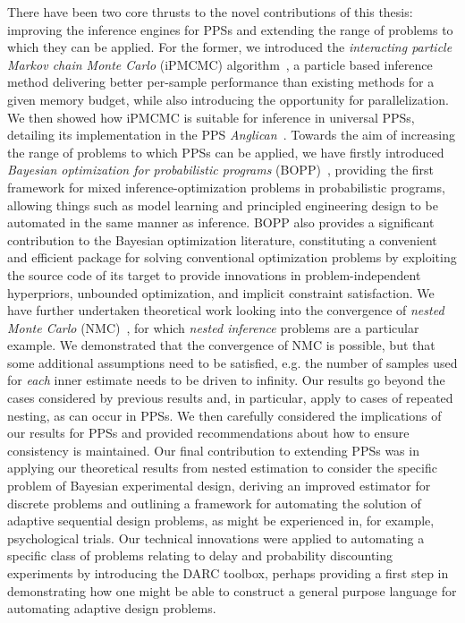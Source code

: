 There have been two core thrusts to the novel contributions of this thesis: improving the inference engines
for PPSs and extending the range of problems to which they can be applied.  For
the former, we introduced the \emph{interacting particle Markov chain Monte Carlo} (iPMCMC)
algorithm~\citep{rainforth2016interacting}, a particle based inference method delivering
better per-sample performance than existing methods for a given memory budget, while also introducing the opportunity for
parallelization.  We then showed how iPMCMC is suitable for inference in universal PPSs, detailing its implementation
in the PPS \emph{Anglican}~\citep{tolpin2016design}.  Towards the aim of increasing the range of problems 
to which PPSs can be applied, 
we have firstly introduced \emph{Bayesian optimization for probabilistic 
	programs} (BOPP)~\citep{rainforth2016bayesian}, providing
the first framework for mixed inference-optimization problems in probabilistic programs, allowing things
such as model learning and principled engineering design to be automated in the same manner as inference.
BOPP also provides a significant contribution to the Bayesian optimization literature, constituting a
convenient and efficient package for solving conventional optimization problems by exploiting the
source code of its target to provide innovations in problem-independent hyperpriors, unbounded
 optimization, and implicit constraint satisfaction.
We have further undertaken theoretical work looking into the convergence of \emph{nested Monte Carlo} (NMC)~\citep{rainforth2017pitfalls}, for which \emph{nested inference} problems are a particular example.
We demonstrated that the convergence
of NMC is possible, but that some additional assumptions need
to be satisfied, e.g. the number of samples used for \emph{each} inner estimate needs to be driven
to infinity.  Our results go beyond the cases considered
by previous results and, in particular, apply to cases of repeated nesting, as can occur in PPSs.
We then carefully considered the implications of our results for PPSs and provided recommendations
about how to ensure consistency is maintained.  Our final contribution to extending PPSs was in
applying our theoretical results from nested estimation to consider the specific problem of Bayesian
experimental design, deriving an improved estimator for discrete problems and outlining a framework
for automating the solution of adaptive sequential design problems, as might be experienced in, for example,
psychological trials.  Our technical innovations were applied to automating
a specific class of problems relating to delay and probability discounting experiments by
introducing the DARC toolbox, perhaps providing a first step in demonstrating how one might
be able to construct a general purpose language for automating adaptive design problems.

